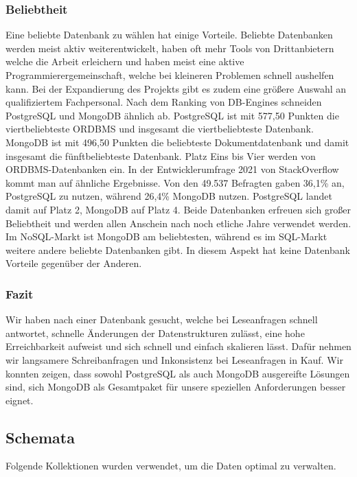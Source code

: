 \subsubsection{Beliebtheit}
Eine beliebte Datenbank zu wählen hat einige Vorteile. Beliebte Datenbanken werden meist aktiv weiterentwickelt, haben oft mehr Tools von Drittanbietern welche die Arbeit erleichern und haben meist eine aktive Programmierergemeinschaft, welche bei kleineren Problemen schnell aushelfen kann. Bei der Expandierung des Projekts gibt es zudem eine größere Auswahl an qualifiziertem Fachpersonal.
Nach dem Ranking von DB-Engines schneiden PostgreSQL und MongoDB ähnlich ab. PostgreSQL ist mit 577,50 Punkten die viertbeliebteste ORDBMS und insgesamt die viertbeliebteste Datenbank. MongoDB ist mit 496,50 Punkten die beliebteste Dokumentdatenbank und damit insgesamt die fünftbeliebteste Datenbank. Platz Eins bis Vier werden von ORDBMS-Datenbanken ein. \cite{DB4}
In der Entwicklerumfrage 2021 von StackOverflow kommt man auf ähnliche Ergebnisse. Von den 49.537 Befragten gaben 36,1\% an, PostgreSQL zu nutzen, während 26,4\% MongoDB nutzen. PostgreSQL landet damit auf Platz 2, MongoDB auf Platz 4. \cite{DB5}
Beide Datenbanken erfreuen sich großer Beliebtheit und werden allen Anschein nach noch etliche Jahre verwendet werden. Im NoSQL-Markt ist MongoDB am beliebtesten, während es im SQL-Markt weitere andere beliebte Datenbanken gibt. In diesem Aspekt hat keine Datenbank Vorteile gegenüber der Anderen.

\subsubsection{Fazit}
Wir haben nach einer Datenbank gesucht, welche bei Leseanfragen schnell antwortet, schnelle Änderungen der Datenstrukturen zulässt, eine hohe Erreichbarkeit aufweist und sich schnell und einfach skalieren lässt. Dafür nehmen wir langsamere Schreibanfragen und Inkonsistenz bei Leseanfragen in Kauf. Wir konnten zeigen, dass sowohl PostgreSQL als auch MongoDB ausgereifte Lösungen sind, sich MongoDB als Gesamtpaket für unsere speziellen Anforderungen besser eignet.

\subsection{Schemata}
Folgende Kollektionen wurden verwendet, um die Daten optimal zu verwalten.

